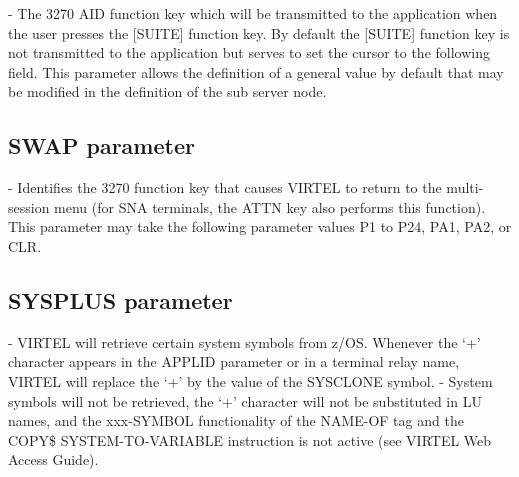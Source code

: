 \documentclass[letterpaper,10pt,english]{sphinxmanual}
\begin{document}
 - The 3270 AID function key which will be transmitted to the application when the user presses the {[}SUITE{]} function key. By default the {[}SUITE{]} function key is not transmitted to the application but serves to set the cursor to the following field. This parameter allows the definition of a general value by default that may be modified in the definition of the sub server node.


\subsection{SWAP parameter}
\label{\detokenize{Installation_Guide:swap-parameter}}\label{\detokenize{Installation_Guide:index-120}}
\begin{sphinxVerbatim}[commandchars=\\\{\}]
 
\end{sphinxVerbatim}

 - Identifies the 3270 function key that causes VIRTEL to return to the multi-session menu (for SNA terminals, the ATTN key also performs this function). This parameter may take the following parameter values P1 to P24, PA1, PA2, or CLR.


\subsection{SYSPLUS parameter}
\label{\detokenize{Installation_Guide:sysplus-parameter}}\label{\detokenize{Installation_Guide:index-121}}
\begin{sphinxVerbatim}[commandchars=\\\{\}]
 
\end{sphinxVerbatim}

 - VIRTEL will retrieve certain system symbols from z/OS. Whenever the ‘+’ character appears in the APPLID parameter or in a terminal relay name, VIRTEL will replace the ‘+’ by the value of the SYSCLONE symbol.
 - System symbols will not be retrieved, the ‘+’ character will not be substituted in LU names, and the xxx-SYMBOL functionality of the NAME-OF tag and the COPY\$ SYSTEM-TO-VARIABLE instruction is not active (see VIRTEL Web Access Guide).
\end{document}
